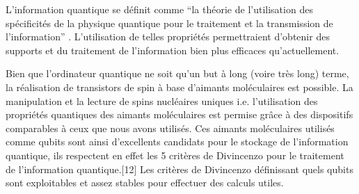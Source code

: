L'information quantique se définit comme “la théorie de l'utilisation des spécificités de la physique quantique pour le traitement et la transmission de l'information” \cite{18}. L'utilisation de telles propriétés permettraient d'obtenir des supports et du traitement de l'information bien plus efficaces qu'actuellement.

Bien que l'ordinateur quantique ne soit qu'un but à long (voire très long) terme, la réalisation de transistors de spin à base d'aimants moléculaires est possible. La manipulation et la lecture de spins nucléaires uniques i.e. l'utilisation des propriétés quantiques des aimants moléculaires est permise grâce à des dispositifs comparables à ceux que nous avons utilisés. Ces aimants moléculaires utilisés comme qubits sont ainsi d'excellents candidats pour le stockage de l'information quantique, ils respectent en effet les 5 critères de Divincenzo pour le traitement de l'information quantique.[12] Les critères de Divincenzo définissant quels qubits sont exploitables et assez stables pour effectuer des calculs utiles.
